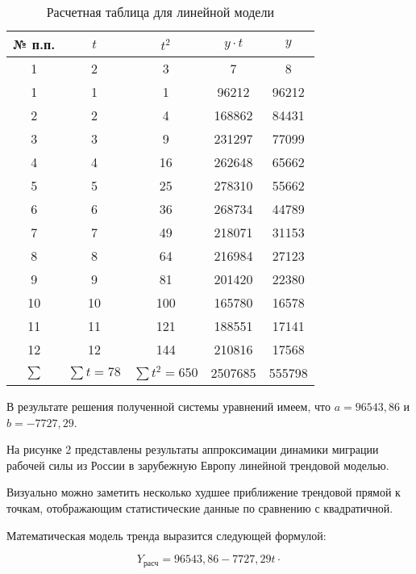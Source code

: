 \documentclass{article}
\begin{document}
\begin{table}[h!]
\centering
\caption{Расчетная таблица для линейной модели}
\begin{tabular}{|c|c|c|c|c|}
\hline
№ п.п. & $t$ & $t^2$ & $y \cdot t$ & $y$ \\ \hline
1 & 2 & 3 & 7 & 8 \\ \hline
1 & 1 & 1 & 96212 & 96212 \\ \hline
2 & 2 & 4 & 168862 & 84431 \\ \hline
3 & 3 & 9 & 231297 & 77099 \\ \hline
4 & 4 & 16 & 262648 & 65662 \\ \hline
5 & 5 & 25 & 278310 & 55662 \\ \hline
6 & 6 & 36 & 268734 & 44789 \\ \hline
7 & 7 & 49 & 218071 & 31153 \\ \hline
8 & 8 & 64 & 216984 & 27123 \\ \hline
9 & 9 & 81 & 201420 & 22380 \\ \hline
10 & 10 & 100 & 165780 & 16578 \\ \hline
11 & 11 & 121 & 188551 & 17141 \\ \hline
12 & 12 & 144 & 210816 & 17568 \\ \hline
$\sum$ & $\sum t = 78$ & $\sum t^2 = 650$ & 2507685 & 555798 \\ \hline
\end{tabular}
\end{table}

\begin{center}
    В результате решения полученной системы уравнений имеем, что 
    \newline $a = 96543,86$ и $b = -7727,29$.    
\end{center}


\newpage


\newline На рисунке 2 представлены результаты аппроксимации динамики миграции рабочей силы из России в зарубежную Европу линейной трендовой моделью.

\newline Визуально можно заметить несколько худшее приближение трендовой прямой к точкам, отображающим статистические данные по сравнению с квадратичной.

\newline Математическая модель тренда выразится следующей формулой:

\begin{equation*}
    Y_{расч} = 96543,86 - 7727,29t \cdot
\end{equation*}    
\end{document}
